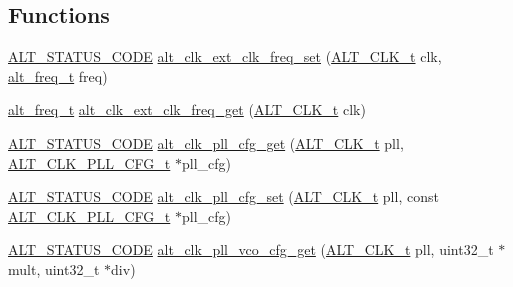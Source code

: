 \subsection*{Functions}
\begin{DoxyCompactItemize}
\item 
\mbox{\hyperlink{hwlib_8h_abdb0d369f069723ca55d6c94bcaaaa12}{A\+L\+T\+\_\+\+S\+T\+A\+T\+U\+S\+\_\+\+C\+O\+DE}} \mbox{\hyperlink{group__CLK__MGR__FREQ_ga994a419c4cb7d4853dcc005d6c10cba0}{alt\+\_\+clk\+\_\+ext\+\_\+clk\+\_\+freq\+\_\+set}} (\mbox{\hyperlink{group__CLK__MGR_ga4cdb80e84284365fe3d47c2f8050b13d}{A\+L\+T\+\_\+\+C\+L\+K\+\_\+t}} clk, \mbox{\hyperlink{group__CLK__MGR_gaa32fe6dfaa6def16098e0039eb336383}{alt\+\_\+freq\+\_\+t}} freq)
\item 
\mbox{\hyperlink{group__CLK__MGR_gaa32fe6dfaa6def16098e0039eb336383}{alt\+\_\+freq\+\_\+t}} \mbox{\hyperlink{group__CLK__MGR__FREQ_gafa9569f52f761e7a1490efb2f18d5383}{alt\+\_\+clk\+\_\+ext\+\_\+clk\+\_\+freq\+\_\+get}} (\mbox{\hyperlink{group__CLK__MGR_ga4cdb80e84284365fe3d47c2f8050b13d}{A\+L\+T\+\_\+\+C\+L\+K\+\_\+t}} clk)
\item 
\mbox{\hyperlink{hwlib_8h_abdb0d369f069723ca55d6c94bcaaaa12}{A\+L\+T\+\_\+\+S\+T\+A\+T\+U\+S\+\_\+\+C\+O\+DE}} \mbox{\hyperlink{group__CLK__MGR__FREQ_ga436cd0f8b5347585a40951cb36b2e74f}{alt\+\_\+clk\+\_\+pll\+\_\+cfg\+\_\+get}} (\mbox{\hyperlink{group__CLK__MGR_ga4cdb80e84284365fe3d47c2f8050b13d}{A\+L\+T\+\_\+\+C\+L\+K\+\_\+t}} pll, \mbox{\hyperlink{group__CLK__MGR__FREQ_ga4224be84fafb79818ab3736b39ad730a}{A\+L\+T\+\_\+\+C\+L\+K\+\_\+\+P\+L\+L\+\_\+\+C\+F\+G\+\_\+t}} $\ast$pll\+\_\+cfg)
\item 
\mbox{\hyperlink{hwlib_8h_abdb0d369f069723ca55d6c94bcaaaa12}{A\+L\+T\+\_\+\+S\+T\+A\+T\+U\+S\+\_\+\+C\+O\+DE}} \mbox{\hyperlink{group__CLK__MGR__FREQ_ga776e9776b81c373eca07b9a576a37c22}{alt\+\_\+clk\+\_\+pll\+\_\+cfg\+\_\+set}} (\mbox{\hyperlink{group__CLK__MGR_ga4cdb80e84284365fe3d47c2f8050b13d}{A\+L\+T\+\_\+\+C\+L\+K\+\_\+t}} pll, const \mbox{\hyperlink{group__CLK__MGR__FREQ_ga4224be84fafb79818ab3736b39ad730a}{A\+L\+T\+\_\+\+C\+L\+K\+\_\+\+P\+L\+L\+\_\+\+C\+F\+G\+\_\+t}} $\ast$pll\+\_\+cfg)
\item 
\mbox{\hyperlink{hwlib_8h_abdb0d369f069723ca55d6c94bcaaaa12}{A\+L\+T\+\_\+\+S\+T\+A\+T\+U\+S\+\_\+\+C\+O\+DE}} \mbox{\hyperlink{group__CLK__MGR__FREQ_gacf8bc69390311aa0d436523d630bede3}{alt\+\_\+clk\+\_\+pll\+\_\+vco\+\_\+cfg\+\_\+get}} (\mbox{\hyperlink{group__CLK__MGR_ga4cdb80e84284365fe3d47c2f8050b13d}{A\+L\+T\+\_\+\+C\+L\+K\+\_\+t}} pll, uint32\+\_\+t $\ast$mult, uint32\+\_\+t $\ast$div)

\end{DoxyCompactItemize}
